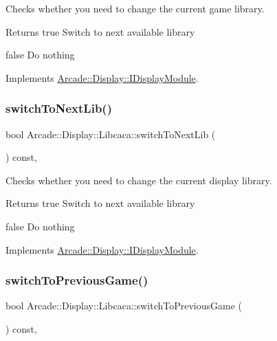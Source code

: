 Checks whether you need to change the current game library. 

\begin{DoxyReturn}{Returns}
true Switch to next available library 

false Do nothing 
\end{DoxyReturn}


Implements \mbox{\hyperlink{classArcade_1_1Display_1_1IDisplayModule_a9584cb0ca3b157c9a4ec94509e4f8e32}{Arcade\+::\+Display\+::\+I\+Display\+Module}}.

\mbox{\label{classArcade_1_1Display_1_1Libcaca_ada47921d3d90780e6817bddd1efcd017}} 
\subsubsection{\texorpdfstring{switchToNextLib()}{switchToNextLib()}}
{\footnotesize\ttfamily bool Arcade\+::\+Display\+::\+Libcaca\+::switch\+To\+Next\+Lib (\begin{DoxyParamCaption}{ }\end{DoxyParamCaption}) const\hspace{0.3cm}{\ttfamily [final]}, {\ttfamily [virtual]}}



Checks whether you need to change the current display library. 

\begin{DoxyReturn}{Returns}
true Switch to next available library 

false Do nothing 
\end{DoxyReturn}


Implements \mbox{\hyperlink{classArcade_1_1Display_1_1IDisplayModule_a0de47361c9d47bf8fc52070b945f23b7}{Arcade\+::\+Display\+::\+I\+Display\+Module}}.

\mbox{\label{classArcade_1_1Display_1_1Libcaca_a2bb528b251b6845c1f429f9f7dc58f4f}} 
\subsubsection{\texorpdfstring{switchToPreviousGame()}{switchToPreviousGame()}}
{\footnotesize\ttfamily bool Arcade\+::\+Display\+::\+Libcaca\+::switch\+To\+Previous\+Game (\begin{DoxyParamCaption}{ }\end{DoxyParamCaption}) const\hspace{0.3cm}{\ttfamily [final]}, {\ttfamily [virtual]}}



